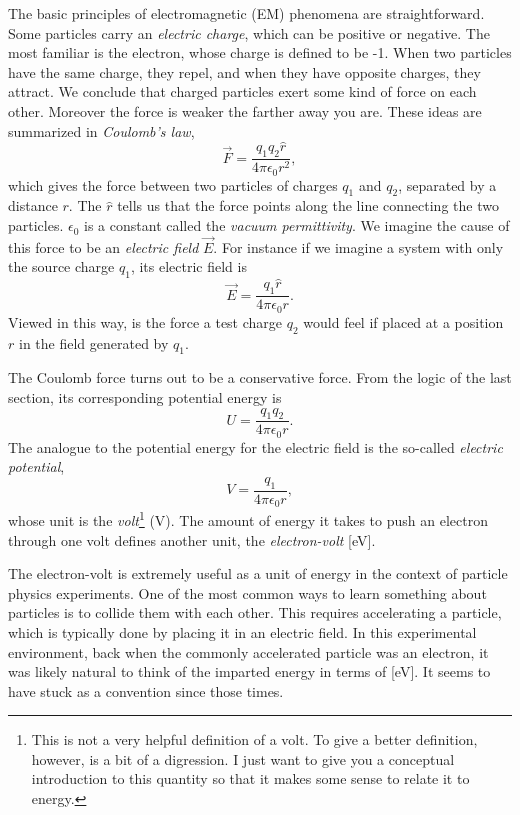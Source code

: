 The basic principles of electromagnetic (EM) phenomena are straightforward.
Some particles carry an {\it electric charge}, which can
be positive or negative. The most familiar is the electron, whose charge is
defined to be -1. When two particles have the same charge, they repel, and when
they have opposite charges, they attract. We conclude that charged particles
exert some kind of force on each other. Moreover the force is weaker the farther
away you are. These ideas are summarized in {\it Coulomb's law},
\begin{equation}\label{eq:coulombForce}
\vec{F}=\frac{q_1 q_2\hat{r}}{4\pi\epsilon_0 r^2},
\end{equation}
which gives the force between two particles of charges $q_1$ and $q_2$,
separated by a distance $r$. The $\hat{r}$ tells us that the force points along
the line connecting the two particles. $\epsilon_0$ is a constant called the {\it
vacuum permittivity}. We imagine the cause of this
force to be an {\it electric field} $\vec{E}$. For instance if we imagine a
system with only the source charge $q_1$, its electric field is
\begin{equation}
\vec{E}=\frac{q_1\hat{r}}{4\pi\epsilon_0r}.
\end{equation}
Viewed in this way,  is the force a test charge $q_2$
would feel if placed at a position $r$ in the field generated by $q_1$.

The Coulomb force turns out to be a conservative force. From the logic of the
last section, its corresponding potential energy is
\begin{equation}
U=\frac{q_1 q_2}{4\pi\epsilon_0 r}.
\end{equation}
The analogue to the potential energy for the electric field is the so-called
{\it electric potential},
\begin{equation}
V=\frac{q_1 }{4\pi\epsilon_0 r},
\end{equation}
whose unit is the {\it volt}\footnote{This is not a very helpful definition of a
volt. To give a better definition, however, is 
a bit of a digression. I just want to give you a conceptual introduction to
this quantity so that it makes some sense to relate it to energy.} (V).
The amount of energy it takes to push an electron through one volt defines
another unit, the {\it electron-volt} [eV].

The electron-volt is extremely useful as a unit of energy in the context of 
particle physics experiments. One of the most common ways to learn something about 
particles is to collide them with each other. This requires accelerating a
particle, which is typically done by placing it in an electric field.
In this experimental environment, back when the commonly accelerated particle was an
electron, it was likely natural to think of the imparted energy in
terms of [eV]. It seems to have stuck as a convention since those times.

